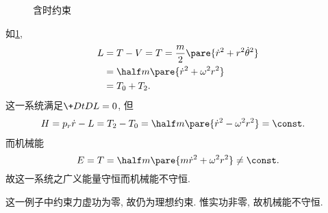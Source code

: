\documentclass[../LectureNotes.tex]{subfiles}
\begin{document}
\begin{figure}
    \centering
    \caption{含时约束}
    \label{fig:含时约束}
\end{figure}
\begin{sample}
    \begin{ex}
        如\cref{fig:含时约束},
        \begin{align*}
            L &= T-V = T = \frac{m}{2}\pare{\dot{r}^2 + r^2\dot{\theta}^2} \\
            &= \half m \pare{\dot{r}^2 + \omega^2 r^2} \\
            &= T_0 + T_2.
        \end{align*}
        这一系统满足$\displaystyle \+DtDL = 0$, 但
        \begin{align*}
            H &= p_r\dot{r} - L = T_2 - T_0 = \half m\pare{\dot{r}^2 - \omega^2r^2} = \const.
        \end{align*}
        而机械能
        \[ E = T = \half m\pare{m\dot{r}^2 + \omega^2 r^2} \neq \const. \]
        故这一系统之广义能量守恒而机械能不守恒.
    \end{ex}
    \begin{remark}
        这一例子中约束力虚功为零, 故仍为理想约束. 惟实功非零, 故机械能不守恒.
    \end{remark}
\end{sample}
\end{document}
